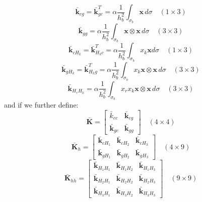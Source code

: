 \documentclass[11pt]{article} %
\begin{document}
\begin{equation}
	\bar{\mathbf{k}}_{cg} = \bar{\mathbf{k}}^T_{gc} = \alpha \frac{1}{h_b^2} \int_{\sigma_b} \mathbf{x} \, d \sigma \quad (1 \times 3)
\end{equation}
\begin{equation}
	\bar{\mathbf{k}}_{gg} = \alpha \frac{1}{h_b^2} \int_{\sigma_b} \mathbf{x} \otimes \mathbf{x} \, d \sigma \quad (3 \times 3)
\end{equation}
\begin{equation}
	\bar{\mathbf{k}}_{cH_k} = \bar{\mathbf{k}}^T_{H_kc} = \alpha \frac{1}{h_b^2} \int_{\sigma_b} x_k \mathbf{x} d \sigma \quad (1 \times 3)
\end{equation}
\begin{equation}
	\bar{\mathbf{k}}_{gH_k} = \bar{\mathbf{k}}_{H_kg}^T = \alpha \frac{1}{h_b^2} \int_{\sigma_b} x_k \mathbf{x} \otimes \mathbf{x} \, d \sigma \quad (3 \times 3)
\end{equation}
\begin{equation}
	\bar{\mathbf{k}}_{H_rH_k} = \alpha \frac{1}{h_b^2} \int_{\sigma_b} x_r x_k \mathbf{x} \otimes \mathbf{x} \, d \sigma \quad (3 \times 3)
\end{equation}
and if we further define:
\begin{equation}
	\bar{\mathbf{K}} = \left[ \begin{array}{ccccc} \bar{k}_{cc} & \bar{\mathbf{k}}_{cg} \\ \bar{\mathbf{k}}_{gc} & \bar{\mathbf{k}}_{gg} \end{array} \right] \quad (4 \times 4)
\end{equation}
\begin{equation}
	\bar{\mathbf{K}}_{h} = \left[ \begin{array}{ccc} \bar{\mathbf{k}}_{cH_1} & \bar{\mathbf{k}}_{cH_2} & \bar{\mathbf{k}}_{cH_3} \\ \bar{\mathbf{k}}_{gH_1} & \bar{\mathbf{k}}_{gH_2} & \bar{\mathbf{k}}_{gH_3} \end{array} \right] \quad (4 \times 9)
\end{equation}
\begin{equation}
	\bar{\mathbf{K}}_{hh} = \left[ \begin{array}{ccc} \bar{\mathbf{k}}_{H_1H_1} & \bar{\mathbf{k}}_{H_1H_2} & \bar{\mathbf{k}}_{H_1H_3} \\ \bar{\mathbf{k}}_{H_2H_1} & \bar{\mathbf{k}}_{H_2H_2} & \bar{\mathbf{k}}_{H_2H_3} \\ \bar{\mathbf{k}}_{H_3H_1} & \bar{\mathbf{k}}_{H_3H_2} & \bar{\mathbf{k}}_{H_3H_3} \end{array} \right] \quad (9 \times 9)
\end{equation}
\end{document}
